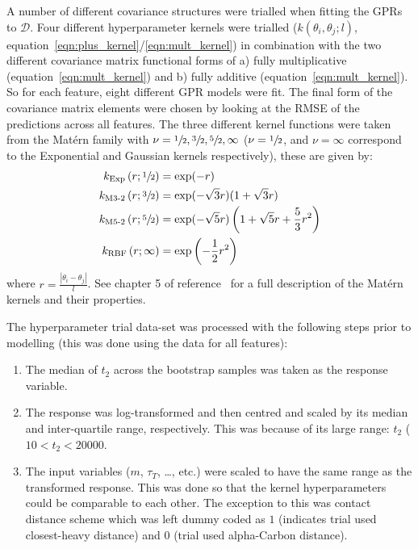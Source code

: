 \documentclass[journal=jacsat,manuscript=article]{achemso}
\begin{document}
A number of different covariance structures were trialled when fitting the GPRs to $\mathcal{D}$. Four different hyperparameter kernels were trialled ($k(\theta_i, \theta_j; l)$, equation~\ref{eqn:plus_kernel}/\ref{eqn:mult_kernel}) in combination with the two different covariance matrix functional forms of a) fully multiplicative (equation~\ref{eqn:mult_kernel}) and b) fully additive (equation~\ref{eqn:mult_kernel}). So for each feature, eight different GPR models were fit. The final form of the covariance matrix elements were chosen by looking at the RMSE of the predictions across all features. The three different kernel functions were taken from the Mat\'ern family with $\nu=\sfrac{1}{2}, \sfrac{3}{2}, \sfrac{5}{2}, \infty$ ($\nu=\sfrac{1}{2}$, and $\nu=\infty$ correspond to the Exponential and Gaussian kernels respectively), these are given by: 
\begin{align}
k_{\text{Exp}}\left(r; \sfrac{1}{2}\right) &=\exp (-r) \label{eqn:kern_exp}\\
k_{\text{M3-2}}\left(r; \sfrac{3}{2}\right) &= \exp (-\sqrt{3} r)(1+\sqrt{3} r) \label{eqn:kern_m32} \\
k_{\text{M5-2}}\left(r; \sfrac{5}{2}\right) &= \exp (-\sqrt{5} r)\left(1+\sqrt{5} r+\frac{5}{3} r^{2}\right) \label{eqn:kern_m52}\\
k_{\text{RBF}}\left(r; \infty\right) &= \exp \left(-\frac{1}{2} r^{2}\right) \label{eqn:kern_gauss}
\end{align}
where $r = \frac{|\theta_i-\theta_j|}{l}$. See chapter 5 of  reference~\cite{rasmussenGaussianProcessesMachine2006} for a full description of the Mat\'{e}rn kernels and their properties.  

The hyperparameter trial data-set was processed with the following steps prior to modelling (this was done using the data for all features):
\begin{enumerate}
    \item The median of $t_2$ across the bootstrap samples was taken as the response variable. 
    \item The response  was log-transformed and then centred and scaled by its median and inter-quartile range, respectively. This was because of its large range: $t_2$ ($10 < t_2 < \num{20000}$. 
    \item The input variables ($m$, $\tau_{T}$, \ldots, etc.) were scaled to have the same range as the transformed response. This was done so that the kernel hyperparameters could be comparable to each other. The exception to this was contact distance scheme which was left dummy coded as $1$ (indicates trial used closest-heavy distance) and $0$ (trial used alpha-Carbon distance). 
\end{enumerate}
\end{document}
